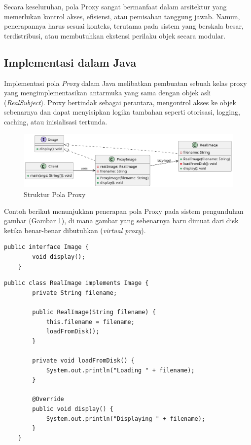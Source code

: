Secara keseluruhan, pola Proxy sangat bermanfaat dalam arsitektur yang memerlukan kontrol akses, efisiensi, atau pemisahan tanggung jawab. Namun, penerapannya harus sesuai konteks, terutama pada sistem yang berskala besar, terdistribusi, atau membutuhkan ekstensi perilaku objek secara modular.

\subsection{Implementasi dalam Java}

Implementasi pola \textit{Proxy} dalam Java melibatkan pembuatan sebuah kelas proxy yang mengimplementasikan antarmuka yang sama dengan objek asli (\textit{RealSubject}). Proxy bertindak sebagai perantara, mengontrol akses ke objek sebenarnya dan dapat menyisipkan logika tambahan seperti otorisasi, logging, caching, atau inisialisasi tertunda.

\begin{figure}[h]
	\centering
	\includegraphics[width=\textwidth]{../figures/out/proxy.png}
	\caption{Struktur Pola Proxy}
	\label{fig:proxy}
\end{figure}

Contoh berikut menunjukkan penerapan pola Proxy pada sistem pengunduhan gambar (Gambar \ref{fig:proxy}), di mana gambar yang sebenarnya baru dimuat dari disk ketika benar-benar dibutuhkan (\textit{virtual proxy}).

\begin{lstlisting}[style=JavaStyle, caption={Subject: Image}, label={lst:proxy-subject}]
	public interface Image {
		void display();
	}
\end{lstlisting}

\begin{lstlisting}[style=JavaStyle, caption={RealSubject: RealImage}, label={lst:proxy-real}]
	public class RealImage implements Image {
		private String filename;
		
		public RealImage(String filename) {
			this.filename = filename;
			loadFromDisk();
		}
		
		private void loadFromDisk() {
			System.out.println("Loading " + filename);
		}
		
		@Override
		public void display() {
			System.out.println("Displaying " + filename);
		}
	}
\end{lstlisting}


